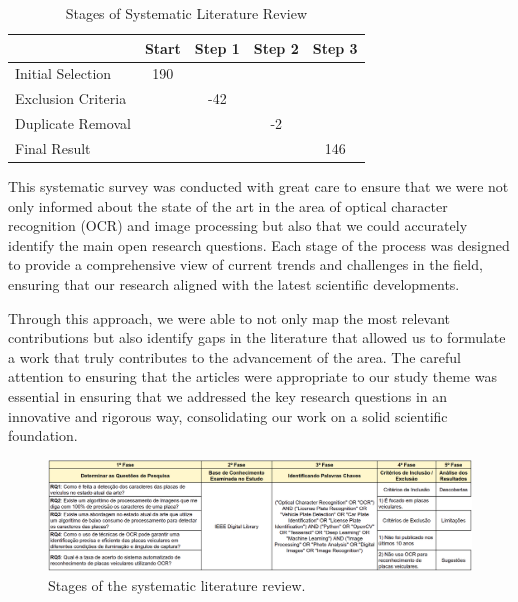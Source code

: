 \documentclass[conference]{IEEEtran}
\begin{document}
    \begin{table}[H]
        \caption{Stages of Systematic Literature Review}
        \begin{center}
            \begin{tabular}{l|c|c|c|c|}
                \cline{2-5}
                & Start & Step 1 & Step 2 & Step 3 \\ \hline
                \multicolumn{1}{|l|}{Initial Selection}       & 190    &         &         &         \\ \hline
                \multicolumn{1}{|l|}{Exclusion Criteria}      &        & -42     &         &         \\ \hline
                \multicolumn{1}{|l|}{Duplicate Removal}       &        &         & -2      &         \\ \hline
                \multicolumn{1}{|l|}{Final Result}            &        &         &         & 146     \\ \hline
            \end{tabular}
            \label{tab1}
        \end{center}
    \end{table}
    
    This systematic survey was conducted with great care to ensure that we were not only informed about the state of the art in the area of optical character recognition (OCR) and image processing but also that we could accurately identify the main open research questions. Each stage of the process was designed to provide a comprehensive view of current trends and challenges in the field, ensuring that our research aligned with the latest scientific developments.
    
    Through this approach, we were able to not only map the most relevant contributions but also identify gaps in the literature that allowed us to formulate a work that truly contributes to the advancement of the area. The careful attention to ensuring that the articles were appropriate to our study theme was essential in ensuring that we addressed the key research questions in an innovative and rigorous way, consolidating our work on a solid scientific foundation.
    
    \begin{figure}[htbp]
        \centerline{\includegraphics[width=\textwidth]{img1.png}}
        \caption{Stages of the systematic literature review.}
        \label{img1}
    \end{figure}
    
\end{document}
